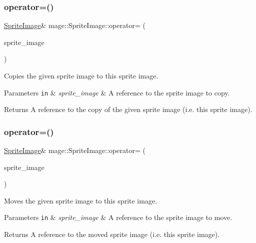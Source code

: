 \subsubsection{\texorpdfstring{operator=()}{operator=()}\hspace{0.1cm}{\footnotesize\ttfamily [1/2]}}
{\footnotesize\ttfamily \hyperlink{classmage_1_1_sprite_image}{Sprite\+Image}\& mage\+::\+Sprite\+Image\+::operator= (\begin{DoxyParamCaption}\item[{const \hyperlink{classmage_1_1_sprite_image}{Sprite\+Image} \&}]{sprite\+\_\+image }\end{DoxyParamCaption})\hspace{0.3cm}{\ttfamily [delete]}}

Copies the given sprite image to this sprite image.


\begin{DoxyParams}[1]{Parameters}
\mbox{\tt in}  & {\em sprite\+\_\+image} & A reference to the sprite image to copy. \\
\hline
\end{DoxyParams}
\begin{DoxyReturn}{Returns}
A reference to the copy of the given sprite image (i.\+e. this sprite image). 
\end{DoxyReturn}
\hypertarget{classmage_1_1_sprite_image_a9f83e728a93550f6b20bb4d500483171}{}\label{classmage_1_1_sprite_image_a9f83e728a93550f6b20bb4d500483171} 
\subsubsection{\texorpdfstring{operator=()}{operator=()}\hspace{0.1cm}{\footnotesize\ttfamily [2/2]}}
{\footnotesize\ttfamily \hyperlink{classmage_1_1_sprite_image}{Sprite\+Image}\& mage\+::\+Sprite\+Image\+::operator= (\begin{DoxyParamCaption}\item[{\hyperlink{classmage_1_1_sprite_image}{Sprite\+Image} \&\&}]{sprite\+\_\+image }\end{DoxyParamCaption})\hspace{0.3cm}{\ttfamily [delete]}}

Moves the given sprite image to this sprite image.


\begin{DoxyParams}[1]{Parameters}
\mbox{\tt in}  & {\em sprite\+\_\+image} & A reference to the sprite image to move. \\
\hline
\end{DoxyParams}
\begin{DoxyReturn}{Returns}
A reference to the moved sprite image (i.\+e. this sprite image). 
\end{DoxyReturn}
\hypertarget{classmage_1_1_sprite_image_ac061b1e201e24097d4b667b8fb53c232}{}\label{classmage_1_1_sprite_image_ac061b1e201e24097d4b667b8fb53c232} 
